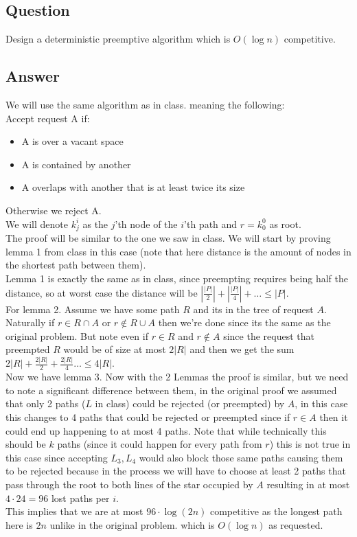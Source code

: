 \subsection*{Question}
Design a deterministic preemptive algorithm which is $O(\log n)$ competitive.

\subsection*{Answer}
We will use the same algorithm as in class. meaning the following:\\
Accept request A if:
\begin{itemize}
    \item A is over a vacant space
    \item A is contained by another
    \item A overlaps with another that is at least twice its size
\end{itemize}
Otherwise we reject A.\\
We will denote $k^i_j$ as the $j$'th node of the $i$'th path and $r=k_0^0$ as root.\\
The proof will be similar to the one we saw in class. We will start by proving lemma 1 from class in this case (note that here distance is the amount of nodes in the shortest path between them).\\
Lemma 1 is exactly the same as in class, since preempting requires being half the distance, so at worst case the distance will be $\left|\frac{|P|}{2}\right|+\left|\frac{|P|}{4}\right|+\dots \leq |P|$.\\
For lemma 2. Assume we have some path $R$ and its in the tree of request $A$. Naturally if $r\in R\cap A$ or $r\notin R\cup A$ then we're done since its the same as the original problem. But note even if $r\in R$ and $r\notin A$ since the request that preempted $R$ would be of size at most $2|R|$ and then we get the sum $2|R| + \frac{2|R|}{2} + \frac{2|R|}{4}\dots\leq 4|R|$.\\
Now we have lemma 3. Now with the 2 Lemmas the proof is similar, but we need to note a significant difference between them, in the original proof we assumed that only 2 paths ($L$ in class) could be rejected (or preempted) by $A$, in this case this changes to 4 paths that could be rejected or preempted since if $r\in A$ then it could end up happening to at most 4 paths. Note that while technically this should be $k$ paths (since it could happen for every path from $r$) this is not true in this case since accepting $L_3, L_4$ would also block those same paths causing them to be rejected because in the process we will have to choose at least 2 paths that pass through the root to both lines of the star occupied by $A$ resulting in at most $4\cdot 24 = 96$ lost paths per $i$.\\
This implies that we are at most $96\cdot\log (2n)$ competitive as the longest path here is $2n$ unlike in the original problem. which is $O(\log n)$ as requested.